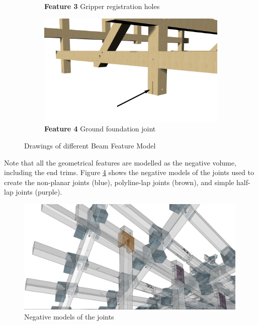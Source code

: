 \begin{figure}[!h]
\begin{subfigure}[b]{0.49\textwidth}
        \caption*{\textbf{Feature 3} Gripper registration holes}
        \label{fig:feature-registration-holes}
    \end{subfigure}
    \hfill
    \begin{subfigure}[b]{0.49\textwidth}
        \centering
        \includegraphics[width=\textwidth]{images/7a/beam-feature-4.jpg}
        \caption*{\textbf{Feature 4} Ground foundation joint}
        \label{fig:feature-ground-foundation-joint}
    \end{subfigure}
    \caption{Drawings of different Beam Feature Model}
    \label{fig:different-beam-feature-model}
\end{figure}

Note that all the geometrical features are modelled as the negative volume, including the end trims. Figure \ref{fig:negative-models-of-the-joints} shows the negative models of the joints used to create the non-planar joints (blue), polyline-lap joints (brown), and simple half-lap joints (purple).

\begin{figure}[!h]
    \centering
    \includegraphics[width=0.99\textwidth]{images/7a/img84.jpg}
    \caption{Negative models of the joints}
    \label{fig:negative-models-of-the-joints}
\end{figure}

